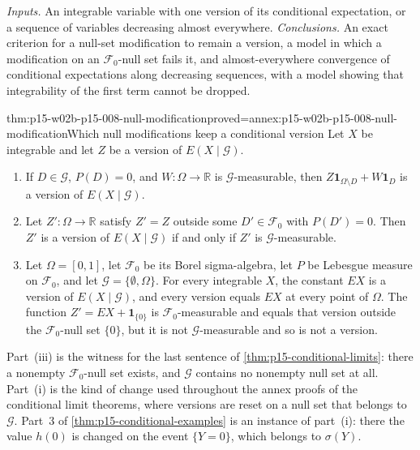 \emph{Inputs.} An integrable variable with one version of its conditional
expectation, or a sequence of variables decreasing almost everywhere.
\emph{Conclusions.} An exact criterion for a null-set modification to
remain a version, a model in which a modification on an
\(\mathcal F_0\)-null set fails it, and almost-everywhere convergence of
conditional expectations along decreasing sequences, with a model showing
that integrability of the first term cannot be dropped.

\begin{hbtheorem}{thm:p15-w02b-p15-008-null-modification}{proved=annex:p15-w02b-p15-008-null-modification}{Which null modifications keep a conditional version}
Let \(X\) be integrable and let \(Z\) be a version of
\(E(X\mid\mathcal G)\).
\begin{enumerate}
\item If \(D\in\mathcal G\), \(P(D)=0\), and \(W:\Omega\to\mathbb R\) is
      \(\mathcal G\)-measurable, then
      \(Z\mathbf1_{\Omega\setminus D}+W\mathbf1_D\) is a version of
      \(E(X\mid\mathcal G)\).
\item Let \(Z':\Omega\to\mathbb R\) satisfy \(Z'=Z\) outside some
      \(D'\in\mathcal F_0\) with \(P(D')=0\). Then \(Z'\) is a version of
      \(E(X\mid\mathcal G)\) if and only if \(Z'\) is
      \(\mathcal G\)-measurable.
\item Let \(\Omega=[0,1]\), let \(\mathcal F_0\) be its Borel
      sigma-algebra, let \(P\) be Lebesgue measure on \(\mathcal F_0\),
      and let \(\mathcal G=\{\emptyset,\Omega\}\). For every integrable
      \(X\), the constant \(EX\) is a version of \(E(X\mid\mathcal G)\),
      and every version equals \(EX\) at every point of \(\Omega\).
      The function \(Z'=EX+\mathbf1_{\{0\}}\) is \(\mathcal F_0\)-measurable
      and equals that version outside the \(\mathcal F_0\)-null set
      \(\{0\}\), but it is not \(\mathcal G\)-measurable and so is not a
      version.
\end{enumerate}
\end{hbtheorem}

Part~(iii) is the witness for the last sentence of
\cref{thm:p15-conditional-limits}: there a nonempty \(\mathcal F_0\)-null
set exists, and \(\mathcal G\) contains no nonempty null set at all.
Part~(i) is the kind of change used throughout the annex proofs of the
conditional limit theorems, where versions are reset on a null set that
belongs to \(\mathcal G\). Part~3 of \cref{thm:p15-conditional-examples}
is an instance of part~(i): there the value \(h(0)\) is changed on the
event \(\{Y=0\}\), which belongs to \(\sigma(Y)\).

